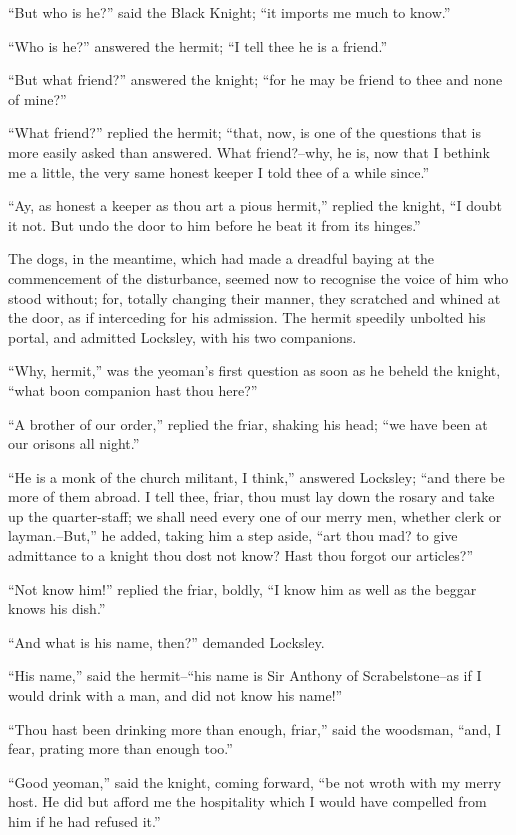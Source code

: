 ``But who is he?'' said the Black Knight; ``it imports me much to
know.''

``Who is he?'' answered the hermit; ``I tell thee he is a friend.''

``But what friend?'' answered the knight; ``for he may be friend to thee
and none of mine?''

``What friend?'' replied the hermit; ``that, now, is one of the
questions that is more easily asked than answered. What friend?--why, he
is, now that I bethink me a little, the very same honest keeper I told
thee of a while since.''

``Ay, as honest a keeper as thou art a pious hermit,'' replied the
knight, ``I doubt it not. But undo the door to him before he beat it
from its hinges.''

The dogs, in the meantime, which had made a dreadful baying at the
commencement of the disturbance, seemed now to recognise the voice of
him who stood without; for, totally changing their manner, they
scratched and whined at the door, as if interceding for his admission.
The hermit speedily unbolted his portal, and admitted Locksley, with his
two companions.

``Why, hermit,'' was the yeoman's first question as soon as he beheld
the knight, ``what boon companion hast thou here?''

``A brother of our order,'' replied the friar, shaking his head; ``we
have been at our orisons all night.''

``He is a monk of the church militant, I think,'' answered Locksley;
``and there be more of them abroad. I tell thee, friar, thou must lay
down the rosary and take up the quarter-staff; we shall need every one
of our merry men, whether clerk or layman.--But,'' he added, taking him
a step aside, ``art thou mad? to give admittance to a knight thou dost
not know? Hast thou forgot our articles?''

``Not know him!'' replied the friar, boldly, ``I know him as well as the
beggar knows his dish.''

``And what is his name, then?'' demanded Locksley.

``His name,'' said the hermit--``his name is Sir Anthony of
Scrabelstone--as if I would drink with a man, and did not know his
name!''

``Thou hast been drinking more than enough, friar,'' said the woodsman,
``and, I fear, prating more than enough too.''

``Good yeoman,'' said the knight, coming forward, ``be not wroth with my
merry host. He did but afford me the hospitality which I would have
compelled from him if he had refused it.''

